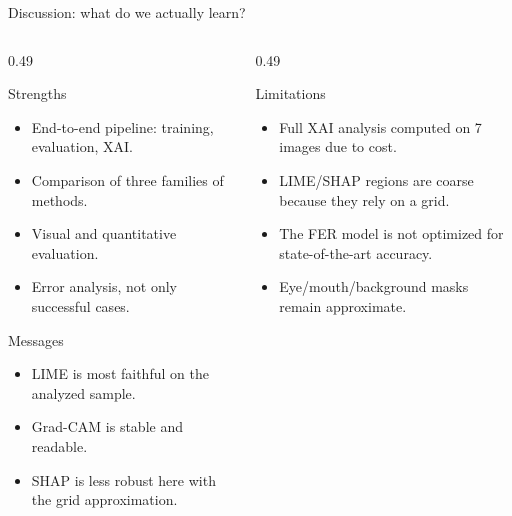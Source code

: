 \documentclass[aspectratio=169,10pt]{beamer}
\begin{document}
\begin{frame}{Discussion: what do we actually learn?}
  \begin{columns}[T,totalwidth=\textwidth]
    \begin{column}{0.49\textwidth}
      \begin{block}{Strengths}
        \begin{itemize}
          \item End-to-end pipeline: training, evaluation, XAI.
          \item Comparison of three families of methods.
          \item Visual and quantitative evaluation.
          \item Error analysis, not only successful cases.
        \end{itemize}
      \end{block}
      \begin{block}{Messages}
        \begin{itemize}
          \item LIME is most faithful on the analyzed sample.
          \item Grad-CAM is stable and readable.
          \item SHAP is less robust here with the grid approximation.
        \end{itemize}
      \end{block}
    \end{column}
    \begin{column}{0.49\textwidth}
      \begin{alertblock}{Limitations}
        \begin{itemize}
          \item Full XAI analysis computed on 7 images due to cost.
          \item LIME/SHAP regions are coarse because they rely on a grid.
          \item The FER model is not optimized for state-of-the-art accuracy.
          \item Eye/mouth/background masks remain approximate.
        \end{itemize}
      \end{alertblock}
    \end{column}
  \end{columns}
\end{frame}
\end{document}
